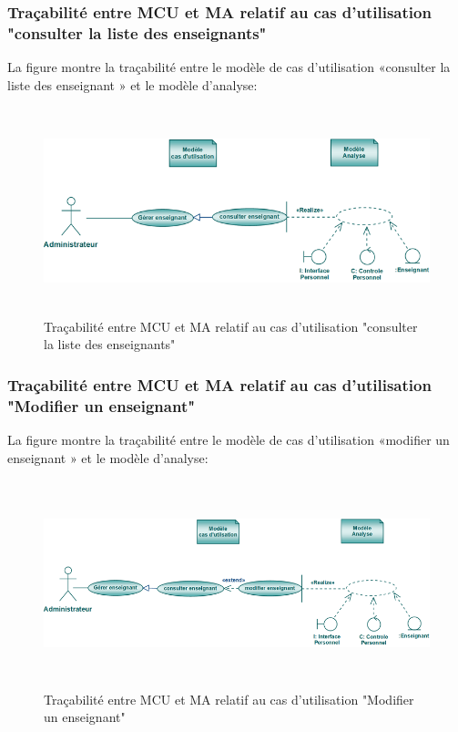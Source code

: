 \documentclass[12 pt]{report}
\begin{document}
\subsubsection{Traçabilité entre MCU et MA relatif au cas d’utilisation "consulter la liste des enseignants" }
La figure  montre la traçabilité entre le modèle de cas d’utilisation «consulter la liste des enseignant » et le modèle
d’analyse:
\begin{figure}[h]
\begin{center}
\includegraphics[width= 13cm , height =6cm]{traconsens.png}
\caption{Traçabilité entre MCU et MA relatif au cas d’utilisation "consulter la liste des enseignants"}
\end{center}
\end{figure} 



\subsubsection{Traçabilité entre MCU et MA relatif au cas d’utilisation "Modifier un enseignant" }
La figure  montre la traçabilité entre le modèle de cas d’utilisation «modifier un enseignant » et le modèle
d’analyse:
\begin{figure}[h]
\begin{center}
\includegraphics[width= 13cm , height =6cm]{mod_ens.png}
\caption{Traçabilité entre MCU et MA relatif au cas d’utilisation "Modifier un enseignant"}
\end{center}
\end{figure} 
\end{document}
